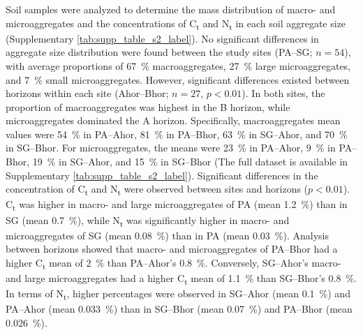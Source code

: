 Soil samples were analyzed to determine the mass distribution of macro- and microaggregates and the concentrations of C\textsubscript{t} and N\textsubscript{t} in each soil aggregate size (Supplementary \cref{tab:supp_table_s2_label}). No significant differences in aggregate size distribution were found between the study sites (PA--SG; \(n = 54\)), with average proportions of \SI{67}{\percent} macroaggregates, \SI{27}{\percent} large microaggregates, and \SI{7}{\percent} small microaggregates. However, significant differences existed between horizons within each site (Ahor--Bhor; \(n = 27\), \(p < 0.01\)). In both sites, the proportion of macroaggregates was highest in the B horizon, while microaggregates dominated the A horizon. Specifically, macroaggregates mean values were \SI{54}{\percent} in PA--Ahor, \SI{81}{\percent} in PA--Bhor, \SI{63}{\percent} in SG--Ahor, and \SI{70}{\percent} in SG--Bhor. For microaggregates, the means were \SI{23}{\percent} in PA--Ahor, \SI{9}{\percent} in PA--Bhor, \SI{19}{\percent} in SG--Ahor, and \SI{15}{\percent} in SG--Bhor (The full dataset is available in Supplementary \cref{tab:supp_table_s2_label}). Significant differences in the concentration of C\textsubscript{t} and N\textsubscript{t} were observed between sites and horizons (\(p < 0.01\)). C\textsubscript{t} was higher in macro- and large microaggregates of PA (mean \SI{1.2}{\percent}) than in SG (mean \SI{0.7}{\percent}), while N\textsubscript{t} was significantly higher in macro- and microaggregates of SG (mean \SI{0.08}{\percent}) than in PA (mean \SI{0.03}{\percent}). Analysis between horizons showed that macro- and microaggregates of PA--Bhor had a higher C\textsubscript{t} mean of \SI{2}{\percent} than PA--Ahor’s \SI{0.8}{\percent}. Conversely, SG--Ahor’s macro- and large microaggregates had a higher C\textsubscript{t} mean of \SI{1.1}{\percent} than SG--Bhor’s \SI{0.8}{\percent}. In terms of N\textsubscript{t}, higher percentages were observed in SG--Ahor (mean \SI{0.1}{\percent}) and PA--Ahor (mean \SI{0.033}{\percent}) than in SG--Bhor (mean \SI{0.07}{\percent}) and PA--Bhor (mean \SI{0.026}{\percent}).


